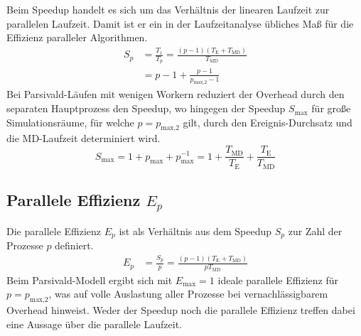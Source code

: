 Beim Speedup handelt es sich um das Verhältnis der linearen Laufzeit zur parallelen Laufzeit.
Damit ist er ein in der Laufzeitanalyse übliches Maß für die Effizienz paralleler Algorithmen.
\begin{align}
  S_p & = \frac{T_1}{T_p} = \frac{\left(p-1\right)\left(T_\text{E} + T_\text{MD}\right)}{T_\text{MD}} \\
      & = p - 1 + \frac{p - 1}{p_\text{max,2} - 1}
\end{align}
Bei Parsivald-Läufen mit wenigen Workern reduziert der Overhead durch den separaten Hauptprozess den Speedup, wo hingegen der Speedup $S_\text{max}$ für große Simulationsräume, für welche $p = p_\text{max,2}$ gilt, durch den Ereignis-Durchsatz und die MD-Laufzeit determiniert wird.
\begin{equation}
  S_\text{max} = 1 + p_\text{max} + p_\text{max}^{-1} = 1 + \frac{T_\text{MD}}{T_\text{E}} + \frac{T_\text{E}}{T_\text{MD}}
\end{equation}

\subsection{Parallele Effizienz $E_p$}

Die parallele Effizienz $E_p$ ist als Verhältnis aus dem Speedup $S_p$ zur Zahl der Prozesse $p$ definiert.
\begin{align}
  E_p & = \frac{S_p}{p} = \frac{\left(p-1\right)\left(T_\text{E} + T_\text{MD}\right)}{p T_\text{MD}}
\end{align}
Beim Parsivald-Modell ergibt sich mit $E_\text{max} = 1$ ideale parallele Effizienz für $p = p_\text{max,2}$, was auf volle Auslastung aller Prozesse bei vernachlässigbarem Overhead hinweist.
Weder der Speedup noch die parallele Effizienz treffen dabei eine Aussage über die parallele Laufzeit.


